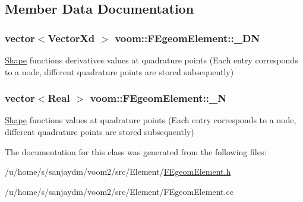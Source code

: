 \subsection{Member Data Documentation}
\hypertarget{classvoom_1_1_f_egeom_element_a1dd12a09866e90fe8738bcea2267a835}{
\subsubsection[{\_\-DN}]{\setlength{\rightskip}{0pt plus 5cm}vector$<$VectorXd $>$ {\bf voom::FEgeomElement::\_\-DN}}}
\label{classvoom_1_1_f_egeom_element_a1dd12a09866e90fe8738bcea2267a835}
\hyperlink{classvoom_1_1_shape}{Shape} functions derivatives values at quadrature points (Each entry corresponds to a node, different quadrature points are stored subsequently) \hypertarget{classvoom_1_1_f_egeom_element_a944e0317c44621247dc303eecbc1b43f}{
\subsubsection[{\_\-N}]{\setlength{\rightskip}{0pt plus 5cm}vector$<$Real $>$ {\bf voom::FEgeomElement::\_\-N}}}
\label{classvoom_1_1_f_egeom_element_a944e0317c44621247dc303eecbc1b43f}
\hyperlink{classvoom_1_1_shape}{Shape} functions values at quadrature points (Each entry corresponds to a node, different quadrature points are stored subsequently) 

The documentation for this class was generated from the following files:\begin{DoxyCompactItemize}
\item 
/u/home/s/sanjaydm/voom2/src/Element/\hyperlink{_f_egeom_element_8h}{FEgeomElement.h}\item 
/u/home/s/sanjaydm/voom2/src/Element/FEgeomElement.cc\end{DoxyCompactItemize}
